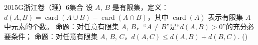 
\begin{problem}{2015}{G}{浙江卷（理）}{6}{集合}
设 $ A $, $ B $ 是有限集，定义：$ d(A,B)=\operatorname{card}(A\cup B)-\operatorname{card}(A\cap B) $，其中 $ \operatorname{card}(A) $ 表示有限集 $ A $ 中元素的个数。  
命题：对任意有限集 $ A $, $ B $，“$ A\neq B $”是“$ d(A,B)>0 $”的充分必要条件；  
命题：对任意有限集 $ A $, $ B $, $ C $，$ d(A,C)\leq d(A,B)+d(B,C) $.  
(\hspace{1cm})  
\begin{choices}
\end{choices}
\end{problem}

\begin{answer}

\end{answer}

\begin{solutions}

\end{solutions}